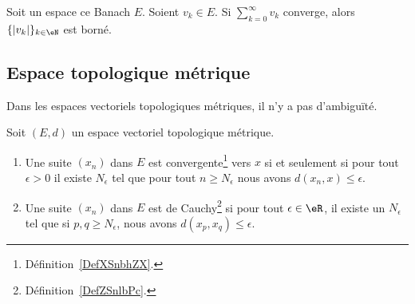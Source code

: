\begin{proposition}	\label{PROPooAPVCooFyMigL}
	Soit un espace ce Banach \( E\). Soient \( v_k\in E\). Si \( \sum_{k=0}^{\infty}v_k\) converge, alors \( \{ | v_k | \}_{k\in \eN} \) est borné.
\end{proposition}

\subsection{Espace topologique métrique}

Dans les espaces vectoriels topologiques métriques, il n'y a pas d'ambiguïté.
\begin{proposition}     \label{PropooUEEOooLeIImr}
	Soit \( (E,d)\) un espace vectoriel topologique métrique.
	\begin{enumerate}
		\item   \label{ItemooROYMooAQCXnj}
		      Une suite \( (x_n)\) dans \( E\) est convergente\footnote{Définition~\ref{DefXSnbhZX}.} vers \( x\) si et seulement si pour tout \( \epsilon>0\) il existe \( N_{\epsilon}\) tel que pour tout \( n\geq N_{\epsilon}\) nous avons \( d(x_n,x)\leq \epsilon\).
		\item
		      Une suite \( (x_n)\) dans \( E\) est de Cauchy\footnote{Définition~\ref{DefZSnlbPc}.} si pour tout \( \epsilon\in \eR\), il existe un \( N_{\epsilon}\) tel que si \( p,q\geq N_{\epsilon}\), nous avons \( d(x_p,x_q)\leq \epsilon\).
	\end{enumerate}
\end{proposition}

